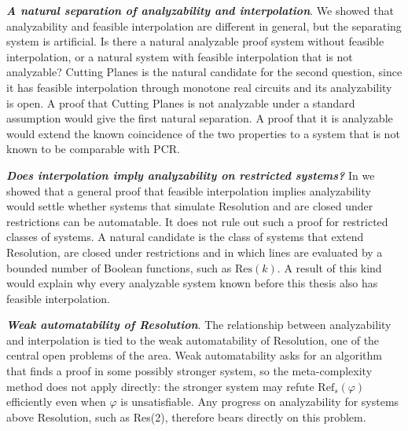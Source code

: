 \textbf{\textit{A natural separation of analyzability and interpolation}}. We showed that analyzability and feasible interpolation are different in general, but the separating system is artificial. Is there a natural analyzable proof system without feasible interpolation, or a natural system with feasible interpolation that is not analyzable? Cutting Planes is the natural candidate for the second question, since it has feasible interpolation through monotone real circuits and its analyzability is open. A proof that Cutting Planes is not analyzable under a standard assumption would give the first natural separation. A proof that it is analyzable would extend the known coincidence of the two properties to a system that is not known to be comparable with PCR.

\textbf{\textit{Does interpolation imply analyzability on restricted systems?}} In  we showed that a general proof that feasible interpolation implies analyzability would settle whether systems that simulate Resolution and are closed under restrictions can be automatable. It does not rule out such a proof for restricted classes of systems. A natural candidate is the class of systems that extend Resolution, are closed under restrictions and in which lines are evaluated by a bounded number of Boolean functions, such as $\mathrm{Res}(k)$. A result of this kind would explain why every analyzable system known before this thesis also has feasible interpolation.

\textbf{\textit{Weak automatability of Resolution}}. The relationship between analyzability and interpolation is tied to the weak automatability of Resolution, one of the central open problems of the area. Weak automatability asks for an algorithm that finds a proof in some possibly stronger system, so the meta-complexity method does not apply directly: the stronger system may refute $\mathrm{Ref}_s(\varphi)$ efficiently even when $\varphi$ is unsatisfiable. Any progress on analyzability for systems above Resolution, such as Res(2), therefore bears directly on this problem.